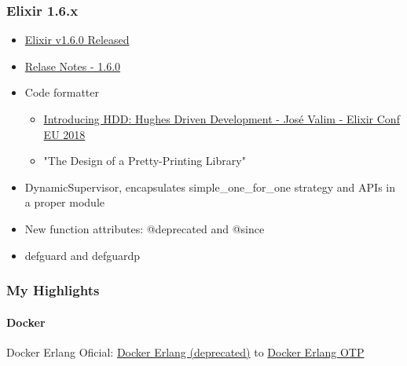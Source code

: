 \documentclass{beamer}
\begin{document}
  \begin{frame}
    \frametitle{Elixir 1.6.x}
    
    \begin{block}{}
      \begin{itemize}
      \item \href{https://elixir-lang.org/blog/2018/01/17/elixir-v1-6-0-released}{Elixir v1.6.0 Released}
      \item \href{https://github.com/elixir-lang/elixir/releases/tag/v1.6.0}{Relase Notes - 1.6.0}
      \end{itemize}
    \end{block}

    \pause
    
    \begin{itemize}[<+->]
      \item Code formatter
      \begin{itemize}
        \item \href{https://www.youtube.com/watch?v=x2ckfhqB9nA}{Introducing HDD: Hughes Driven Development - José Valim - Elixir Conf EU 2018}
        \item "The Design of a Pretty-Printing Library"
      \end{itemize}
      \item DynamicSupervisor, encapsulates simple\_one\_for\_one strategy and APIs in a proper module
      \item New function attributes: @deprecated and @since
      \item defguard and defguardp    
    \end{itemize}

  \end{frame}  

  \begin{frame}
    \frametitle{My Highlights}
    \framesubtitle{Docker}
    
    \begin{block}{}
        Docker Erlang Oficial: \href{https://github.com/erlang/docker-erlang}{Docker Erlang (deprecated)} to \href{https://github.com/erlang/docker-erlang-otp}{Docker Erlang OTP}
    \end{block}
    
  \end{frame}
  
\end{document}
